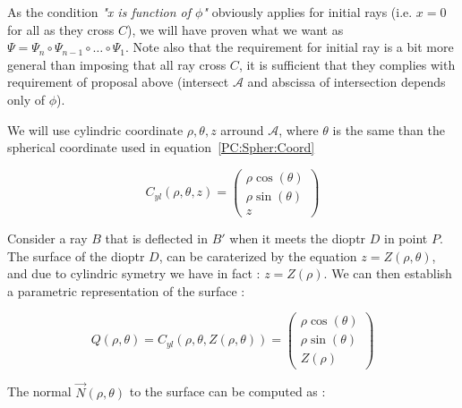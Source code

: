 As the condition \emph{"x is function of $\phi$"} obviously applies for initial rays (i.e. $x=0$ for all as they cross $C$),
we will have proven what we want as $\Psi = \Psi_n \circ  \Psi_{n-1} \circ \dots \circ \Psi_1$. Note also that the requirement
for initial ray is a bit more general than imposing that all ray cross $C$, it is sufficient that they complies with requirement
of proposal above (intersect $\mathcal{A}$ and abscissa of intersection depends only of $\phi$).


We will use cylindric coordinate $\rho,\theta,z$ arround $\mathcal{A}$, where $\theta$ is the same than the spherical
coordinate used in equation~\ref{PC:Spher:Coord}

\begin{equation}
	C_{yl}(\rho,\theta,z)   =\begin{pmatrix} \rho \cos(\theta)  \\ \rho \sin(\theta)   \\ z \end{pmatrix}
	     \label{PC:Cyl:Coord}
\end{equation}

Consider a ray $B$ that is deflected in $B'$ when it meets the dioptr  $D$ in point $P$.
The surface of the dioptr $D$, can be caraterized by the equation $z=Z(\rho,\theta)$, and due to cylindric symetry we have in fact :
$z=Z(\rho)$.  We can then establish a parametric representation of the surface :

\begin{equation}
	Q(\rho,\theta) =  C_{yl}(\rho,\theta,Z(\rho,\theta)) = \begin{pmatrix} \rho \cos(\theta)  \\ \rho \sin(\theta)   \\ Z(\rho) \end{pmatrix}
\end{equation}

The normal $\vec{N}(\rho,\theta) $ to the surface can be computed as :


